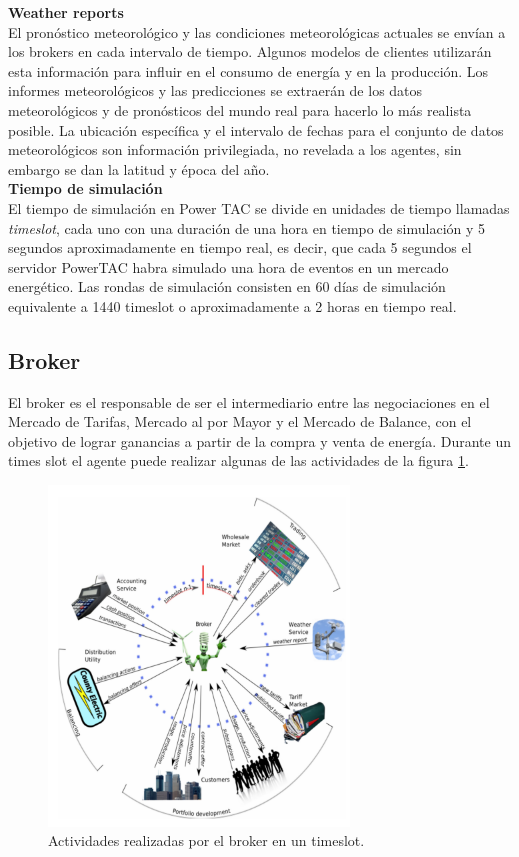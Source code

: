 \textbf{Weather reports}\\

El pronóstico meteorológico y las condiciones meteorológicas actuales se envían a los brokers en cada intervalo de tiempo. Algunos modelos de clientes utilizarán esta información para influir en el consumo de energía y en la producción. Los informes meteorológicos y las predicciones se extraerán de los datos meteorológicos y de pronósticos del mundo real para hacerlo lo más realista posible. La ubicación específica y el intervalo de fechas para el conjunto de datos meteorológicos son información privilegiada, no revelada a los agentes, sin embargo se dan la latitud y época del año.\\

\textbf{Tiempo de simulación}\\

El tiempo de simulación en Power TAC se divide en unidades de tiempo llamadas \textit{timeslot}, cada uno con una duración de una hora en tiempo de simulación y 5 segundos aproximadamente en tiempo real, es decir, que cada 5 segundos el servidor PowerTAC habra simulado una hora de eventos en un mercado energético.
Las rondas de simulación consisten en 60 días de simulación equivalente a 1440 timeslot o aproximadamente a 2 horas en tiempo real.\\

\subsection{Broker}

El broker es el responsable de ser el intermediario entre las negociaciones en el Mercado de Tarifas, Mercado al por Mayor y el Mercado de Balance, con el objetivo de lograr ganancias a partir de la compra y venta de energía. Durante un times slot el agente puede realizar algunas de las actividades de la figura \ref{fig:activity}.

\begin{figure}[!h]
	\centering
	\includegraphics[width=8cm]{img/process.png}
	\caption{Actividades realizadas por el broker en un timeslot.}
	\label{fig:activity}
\end{figure}

